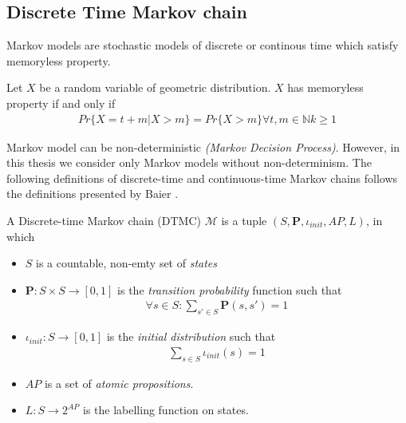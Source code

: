 \subsection{Discrete Time Markov chain}
Markov models are stochastic models of discrete or continous time which satisfy memoryless property.
\begin{definition}
    Let $X$ be a random variable of geometric distribution. $X$ has memoryless property if and only if
    \begin{align*}
        Pr\{X = t + m | X > m\} = Pr\{X > m\} \forall t,m \in \mathbb{N} k \geq 1
    \end{align*}
\end{definition}
Markov model can be non-deterministic \textit{(Markov Decision Process)}. However, in this thesis we
consider only Markov models without non-determinism. The following definitions of discrete-time and
continuous-time Markov chains follows the definitions presented by Baier \cite{baier2008principles}.
\begin{definition}
    A Discrete-time Markov chain (DTMC) $\mathcal{M}$ is a tuple $(S,\mathbf{P}, \iota_{init}, AP, L)$,
    in which
    \begin{itemize}
        \item $S$ is a countable, non-emty set of \textit{states}
        \item $\mathbf{P}:S\times S \rightarrow [0,1]$ is the \textit{transition probability}
              function such that
              \begin{align*}
                  \forall s \in S : \sum_{s'\in S}\mathbf{P}(s, s') = 1
              \end{align*}
        \item $\iota_{init}: S \rightarrow [0,1]$ is the \textit{initial distribution} such that
              \begin{align*}
                  \sum_{s\in S} \iota_{init}(s) = 1
              \end{align*}
        \item $AP$ is a set of \textit{atomic propositions}.
        \item $L: S \rightarrow 2^{AP}$ is the labelling function on states.
    \end{itemize}
\end{definition}


